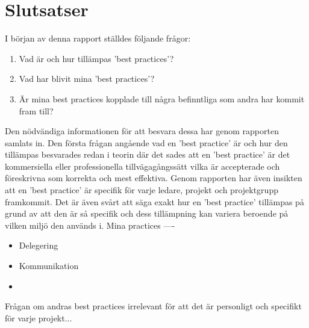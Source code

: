 \section{Slutsatser}
I början av denna rapport ställdes följande frågor:
\begin{enumerate}
		\item Vad är och hur tillämpas 'best practices'?
		\item Vad har blivit mina 'best practices'?
		\item Är mina best practices kopplade till några befinntliga som andra har kommit fram till?
\end{enumerate}
Den nödvändiga informationen för att besvara dessa har genom rapporten samlats in. Den första frågan angående vad en 'best practice' är och hur den tillämpas besvarades redan i teorin där det sades att en 'best practice' är det kommersiella eller professionella tillvägagångssätt vilka är accepterade och föreskrivna som korrekta och mest effektiva. Genom rapporten har även insikten att en 'best practice' är specifik för varje ledare, projekt och projektgrupp framkommit. Det är även svårt att säga exakt hur en 'best practice' tillämpas på grund av att den är så specifik och dess tillämpning kan variera beroende på vilken miljö den används i. 
\newline \newline 
Mina practices ----
\begin{itemize}
	\item Delegering
	\item Kommunikation
	\item
\end{itemize}
Frågan om andras best practices irrelevant för att det är personligt och specifikt för varje projekt...